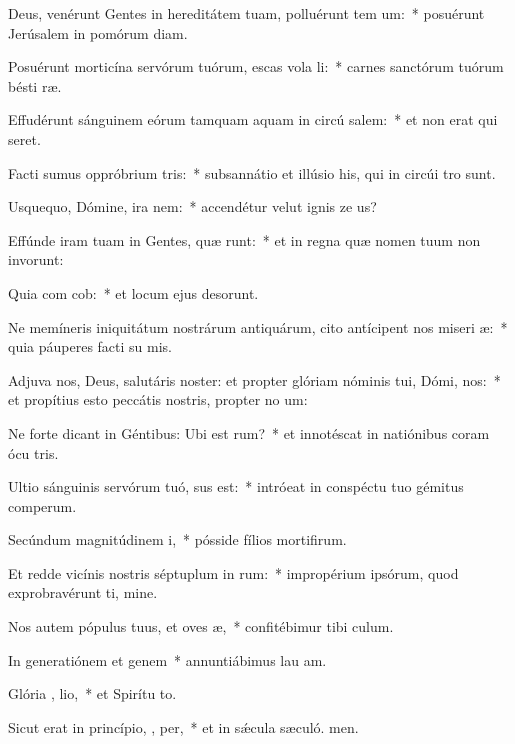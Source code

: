 \item Deus, venérunt Gentes in hereditátem tuam, polluérunt tem  um:~* posuérunt Jerúsalem in pomórum diam.
\item Posuérunt morticína servórum tuórum, escas vola li:~* carnes sanctórum tuórum bésti ræ.
\item Effudérunt sánguinem eórum tamquam aquam in circú salem:~* et non erat qui seret.
\item Facti sumus oppróbrium  tris:~* subsannátio et illúsio his, qui in circúi tro sunt.
\item Usquequo, Dómine, ira  nem:~* accendétur velut ignis ze us?
\item Effúnde iram tuam in Gentes, quæ   runt:~* et in regna quæ nomen tuum non invorunt:
\item Quia com cob:~* et locum ejus desorunt.
\item Ne memíneris iniquitátum nostrárum antiquárum, cito antícipent nos miseri æ:~* quia páuperes facti su mis.
\item Adjuva nos, Deus, salutáris noster: et propter glóriam nóminis tui, Dómi,  nos:~* et propítius esto peccátis nostris, propter no um:
\item Ne forte dicant in Géntibus: Ubi est  rum?~* et innotéscat in natiónibus coram ócu tris.
\item Ultio sánguinis servórum tuó,  sus est:~* intróeat in conspéctu tuo gémitus comperum.
\item Secúndum magnitúdinem  i,~* pósside fílios mortifirum.
\item Et redde vicínis nostris séptuplum in  rum:~* impropérium ipsórum, quod exprobravérunt ti, mine.
\item Nos autem pópulus tuus, et oves  æ,~* confitébimur tibi  culum.
\item In generatiónem et genem~* annuntiábimus lau am.
\item Glória ,  lio,~* et Spirítu to.
\item Sicut erat in princípio,  ,  per,~* et in sǽcula sæculó. men.
